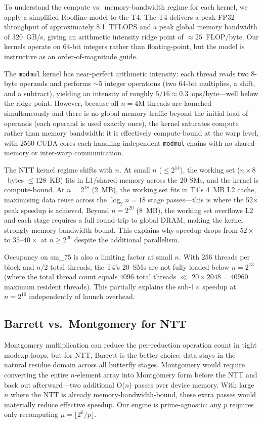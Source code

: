 \documentclass[conference]{IEEEtran}
\begin{document}
To understand the compute vs.\ memory-bandwidth regime for each kernel, we apply
a simplified Roofline model to the T4.
The T4 delivers a peak FP32 throughput of approximately 8.1~TFLOPS and a peak
global memory bandwidth of 320~GB/s, giving an arithmetic intensity ridge point
of $\approx 25$~FLOP/byte. Our kernels operate on 64-bit integers rather than
floating-point, but the model is instructive as an order-of-magnitude guide.

The \texttt{modmul} kernel has near-perfect arithmetic intensity: each thread
reads two 8-byte operands and performs $\sim$5 integer operations (two 64-bit
multiplies, a shift, and a subtract), yielding an intensity of roughly $5/16
\approx 0.3$~ops/byte---well below the ridge point. However, because all
$n = 4$M threads are launched simultaneously and there is no global memory
traffic beyond the initial load of operands (each operand is used exactly once),
the kernel saturates compute rather than memory bandwidth: it is effectively
compute-bound at the warp level, with 2560 CUDA cores each handling independent
\texttt{modmul} chains with no shared-memory or inter-warp communication.

The NTT kernel regime shifts with $n$. At small $n$ ($\leq 2^{14}$), the working
set ($n \times 8$~bytes $\leq 128$~KB) fits in L1/shared memory across the 20
SMs, and the kernel is compute-bound. At $n = 2^{18}$ (2~MB), the working set
fits in T4's 4~MB L2 cache, maximising data reuse across the $\log_2 n = 18$
stage passes---this is where the 52$\times$ peak speedup is achieved. Beyond
$n = 2^{20}$ (8~MB), the working set overflows L2 and each stage requires a
full round-trip to global DRAM, making the kernel strongly memory-bandwidth-bound.
This explains why speedup drops from $52\times$ to $35\text{--}40\times$ at
$n \geq 2^{20}$ despite the additional parallelism.

Occupancy on sm\_75 is also a limiting factor at small $n$.
With 256 threads per block and $n/2$ total threads, the T4's 20~SMs are not
fully loaded below $n = 2^{13}$ (where the total thread count equals
$4096$ total threads $\ll$ $20 \times 2048 = 40960$ maximum resident threads). This partially explains the
sub-1$\times$ speedup at $n = 2^{10}$ independently of launch overhead.

\subsection{Barrett vs.\ Montgomery for NTT}

Montgomery multiplication can reduce the per-reduction operation count in
tight modexp loops, but for NTT, Barrett is the better choice: data stays in
the natural residue domain across all butterfly stages. Montgomery would require
converting the entire $n$-element array into Montgomery form before the NTT and
back out afterward---two additional O($n$) passes over device memory. With large
$n$ where the NTT is already memory-bandwidth-bound, these extra passes would
materially reduce effective speedup. Our engine is prime-agnostic: any $p$
requires only recomputing $\mu = \lfloor 2^k / p \rfloor$.
\end{document}
